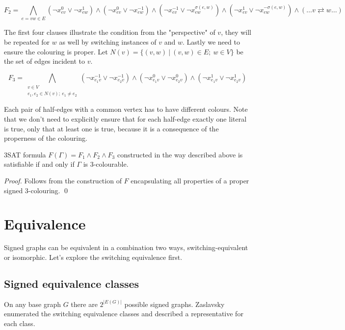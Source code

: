 $$F_2 = \bigwedge _{e = vw \in E} (\neg x^{0}_{ev} \vee \neg x^{1}_{ew}) \wedge (\neg x^{0}_{ev} \vee \neg x^{-1}_{ew}) \wedge (\neg x^{-1}_{ev} \lor \neg x^{\sigma (e, w)}_{ew}) \land (\neg x^{1}_{ev} \lor \neg x^{-\sigma (e, w)}_{ew}) \wedge (\dots v \rightleftarrows w \dots) $$

The first four clauses illustrate the condition from the "perspective" of $v$, they will be repeated for $w$ as well by switching instances of $v$ and $w$. Lastly we need to ensure the colouring is proper. Let $N(v) = \{(v, w) ~|~ (v,w) \in E; ~ w \in V \}$ be the set of edges incident to $v$.

$$F_3 = \bigwedge _{\substack{v \in V \\ e_1, e_2 \in N(v); ~ e_1 \neq e_2}} (\neg x^{-1}_{e_1v} \lor \neg x^{-1}_{e_2v}) \land (\neg x^{0}_{e_1v} \lor \neg x^{0}_{e_2v}) \land (\neg x^{1}_{e_1v} \lor \neg x^{1}_{e_2v}) $$

Each pair of half-edges with a common vertex has to have different colours. Note that we don't need to explicitly ensure that for each half-edge exactly one literal is true, only that at least one is true, because it is a consequence of the properness of the colouring.

\begin{theorem}
    3SAT formula $F(\Gamma) = F_1 \wedge F_2 \wedge F_3$ constructed in the way described above is satisfiable if and only if $\Gamma$ is 3-colourable.
\end{theorem}

\textit{Proof.} Follows from the construction of $F$ encapsulating all properties of a proper signed 3-colouring. \qed

\section{Equivalence}

Signed graphs can be equivalent in a combination two ways, switching-equivalent or isomorphic. Let's explore the switching equivalence first.

\subsection{Signed equivalence classes}

On any base graph $G$ there are $2^{|E(G)|}$ possible signed graphs. Zaslavsky\cite{zaslavsky-graphs} enumerated the switching equivalence classes and described a representative for each class.

